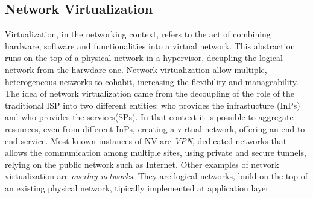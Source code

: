 \subsection{Network Virtualization}
Virtualization, in the networking context, refers to the act of combining
hardware, software and functionalities into a virtual network. This abstraction
runs on the top of a physical network in a hypervisor, decupling the logical
network from the harwdare one. Network virtualization allow multiple,
heterogeneous networks to cohabit, increasing the flexibility and manageability.
The idea of network virtualization came from the decoupling of the role of the
traditional ISP into two different entities: who provides the infrastucture
(InPs) and who provides the services(SPs). In that context it is possible to
aggregate resources, even from different InPs, creating a virtual network,
offering an end-to-end service. Most known instances of NV are \emph{VPN},
dedicated networks that allows the communication among multiple sites, using
private and secure tunnels, relying on the public network such as Internet.
Other examples of netvork virtualization are \emph{overlay networks}. They are
logical networks, build on the top of an existing physical network, tipically
implemented at application layer. 


